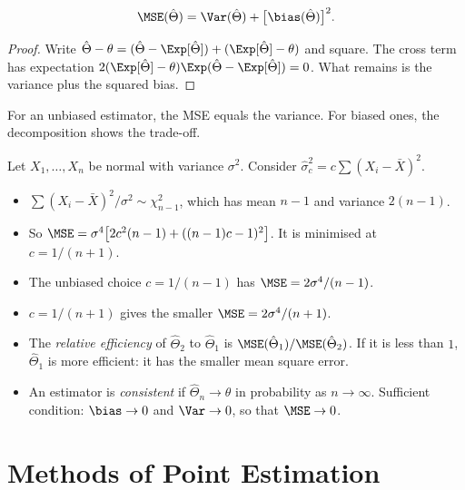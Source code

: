 \begin{theorem}\label{thm:biasvar}
\[ \MSE(\hat\Theta)=\Var(\hat\Theta)+\big[\bias(\hat\Theta)\big]^2. \]
\end{theorem}

\begin{proof}
Write $\hat\Theta-\theta=(\hat\Theta-\Exp[\hat\Theta])+(\Exp[\hat\Theta]-\theta)$ and square. The cross term has expectation $2(\Exp[\hat\Theta]-\theta)\Exp(\hat\Theta-\Exp[\hat\Theta])=0$. What remains is the variance plus the squared bias.
\end{proof}

For an unbiased estimator, the MSE equals the variance. For biased ones, the decomposition shows the trade-off.

\begin{example}\label{ex:mseexample}
Let $X_1,\dots,X_n$ be normal with variance $\sigma^2$. Consider $\hat\sigma^2_c=c\sum(X_i-\bar{X})^2$.
\begin{itemize}
  \item $\sum(X_i-\bar{X})^2/\sigma^2\sim\chi^2_{n-1}$, which has mean $n-1$ and variance $2(n-1)$.
  \item So $\MSE=\sigma^4\big[2c^2(n-1)+((n-1)c-1)^2\big]$. It is minimised at $c=1/(n+1)$.
  \item The unbiased choice $c=1/(n-1)$ has $\MSE=2\sigma^4/(n-1)$.
  \item $c=1/(n+1)$ gives the smaller $\MSE=2\sigma^4/(n+1)$.
\end{itemize}
\end{example}

\begin{definition}
\begin{itemize}
  \item The \emph{relative efficiency} of $\hat\Theta_2$ to $\hat\Theta_1$ is $\MSE(\hat\Theta_1)/\MSE(\hat\Theta_2)$. If it is less than $1$, $\hat\Theta_1$ is more efficient: it has the smaller mean square error.
  \item An estimator is \emph{consistent} if $\hat\Theta_n\to\theta$ in probability as $n\to\infty$. Sufficient condition: $\bias\to0$ and $\Var\to0$, so that $\MSE\to0$.
\end{itemize}
\end{definition}

\section{Methods of Point Estimation}

